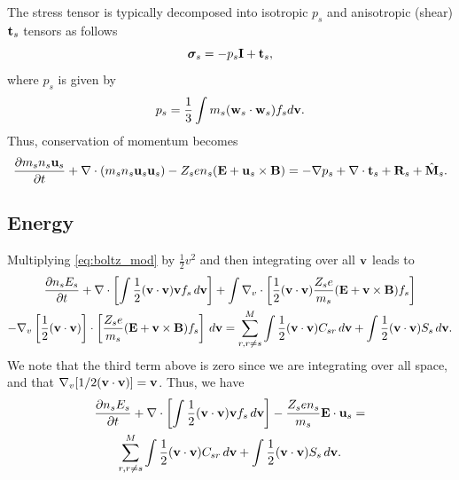\documentclass[a4paper,11pt]{report}
\begin{document}
The stress tensor is typically decomposed into isotropic $p_s$ and anisotropic (shear) $\mathbf{t}_s$ tensors as follows
\begin{equation}
\boldsymbol{\sigma}_s = - p_s \mathbf{I} + \mathbf{t}_s,
\end{equation}
where $p_s$ is given by
\begin{equation}
p_s = \frac{1}{3} \int m_s (\mathbf{w}_s \cdot \mathbf{w}_s) f_s d\mathbf{v}.
\end{equation}
Thus, conservation of momentum becomes
\begin{equation}
\label{eq:mom_derv_6}
\frac{\partial m_s n_s \mathbf{u}_s}{\partial t} + \nabla \cdot \left ( m_s n_s \mathbf{u}_s \mathbf{u}_s \right) - Z_s e n_s ( \mathbf{E} + \mathbf{u}_s \times \mathbf{B} ) = - \nabla p_s + \nabla \cdot \mathbf{t}_s + \mathbf{R}_s + \hat{\mathbf{M}}_s.
\end{equation}

\subsection{Energy}
Multiplying \cref{eq:boltz_mod} by $\frac{1}{2} v^2$ and then integrating over all $\mathbf{v}$ leads to
\begin{multline}
\label{eq:energy_derv_1}
\frac{\partial n_s E_s}{\partial t} + \nabla \cdot \left [ \int \frac{1}{2} (\mathbf{v} \cdot \mathbf{v}) \mathbf{v} f_s \, d\mathbf{v} \right ] + \int \nabla_v \cdot \left [ \frac{1}{2} (\mathbf{v} \cdot \mathbf{v}) \frac{Z_s e}{m_s} ( \mathbf{E} + \mathbf{v} \times \mathbf{B} ) f_s \right ] \\
- \nabla_v \left [ \frac{1}{2} (\mathbf{v} \cdot \mathbf{v}) \right ] \cdot \left [ \frac{Z_s e}{m_s} ( \mathbf{E} + \mathbf{v} \times \mathbf{B} ) f_s \right ] \, d\mathbf{v} = \sum_{r, r \ne s}^M \int \frac{1}{2} (\mathbf{v} \cdot \mathbf{v}) C_{s r} \, d\mathbf{v} + \int \frac{1}{2} (\mathbf{v} \cdot \mathbf{v}) S_s \, d\mathbf{v}.
\end{multline}
We note that the third term above is zero since we are integrating over all space, and that $\nabla_v [ 1/2 (\mathbf{v} \cdot \mathbf{v} ) ] = \mathbf{v}$. Thus, we have
\begin{multline}
\label{eq:energy_derv_2}
\frac{\partial n_s E_s}{\partial t} + \nabla \cdot \left [ \int \frac{1}{2} (\mathbf{v} \cdot \mathbf{v}) \mathbf{v} f_s \, d\mathbf{v} \right ] - \frac{Z_s e n_s}{m_s} \mathbf{E} \cdot \mathbf{u}_s =\\
\sum_{r, r \ne s}^M \int \frac{1}{2} (\mathbf{v} \cdot \mathbf{v}) C_{s r} \, d\mathbf{v} + \int \frac{1}{2} (\mathbf{v} \cdot \mathbf{v}) S_s \, d\mathbf{v}.
\end{multline}
\end{document}
